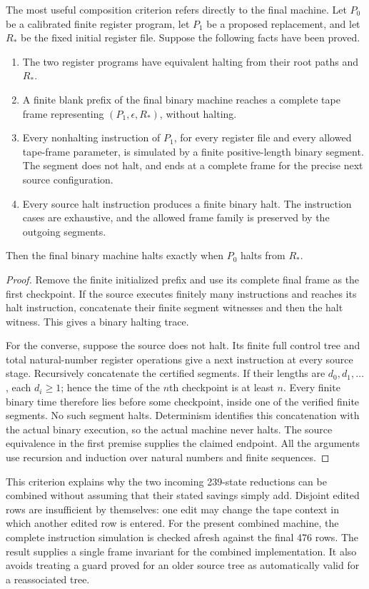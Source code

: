 The most useful composition criterion refers directly to the final
machine.  Let $P_0$ be a calibrated finite register program, let $P_1$ be
a proposed replacement, and let $R_*$ be the fixed initial register file.
Suppose the following facts have been proved.
\begin{enumerate}
\item The two register programs have equivalent halting from their root
      paths and $R_*$.
\item A finite blank prefix of the final binary machine reaches a complete
      tape frame representing $(P_1,\epsilon,R_*)$, without halting.
\item Every nonhalting instruction of $P_1$, for every register file and
      every allowed tape-frame parameter, is simulated by a finite
      positive-length binary segment.  The segment does not halt, and
      ends at a complete frame for the precise next source configuration.
\item Every source halt instruction produces a finite binary halt.
      The instruction cases are exhaustive, and the allowed frame family
      is preserved by the outgoing segments.
\end{enumerate}
Then the final binary machine halts exactly when $P_0$ halts from $R_*$.

\begin{proof}
Remove the finite initialized prefix and use its complete final frame as
the first checkpoint.  If the source executes finitely many instructions
and reaches its halt instruction, concatenate their finite segment
witnesses and then the halt witness.  This gives a binary halting trace.

For the converse, suppose the source does not halt.  Its finite full
control tree and total natural-number register operations give a next
instruction at every source stage.  Recursively concatenate the certified
segments.  If their lengths are $d_0,d_1,\ldots$, each $d_i\geq1$; hence
the time of the $n$th checkpoint is at least $n$.  Every finite binary time
therefore lies before some checkpoint, inside one of the verified finite
segments.  No such segment halts.  Determinism identifies this concatenation
with the actual binary execution, so the actual machine never halts.
The source equivalence in the first premise supplies the claimed endpoint.
All the arguments use recursion and induction over natural numbers and
finite sequences.
\end{proof}

This criterion explains why the two incoming 239-state reductions can be
combined without assuming that their stated savings simply add.  Disjoint
edited rows are insufficient by themselves: one edit may change the tape
context in which another edited row is entered.  For the present combined
machine, the complete instruction simulation is checked afresh against
the final 476 rows.  The result supplies a single frame invariant for the
combined implementation.  It also avoids treating a guard proved for an
older source tree as automatically valid for a reassociated tree.

